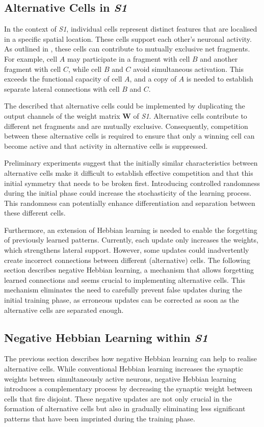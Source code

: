 \subsection{Alternative Cells in \emph{S1}}
In the context of \emph{S1}, individual cells represent distinct features that are localised in a specific spatial location. These cells support each other's neuronal activity. As outlined in , these cells can contribute to mutually exclusive net fragments. For example, cell $A$ may participate in a fragment with cell $B$ and another fragment with cell $C$, while cell $B$ and $C$ avoid simultaneous activation. This exceeds the functional capacity of cell $A$, and a copy of $A$ is needed to establish separate lateral connections with cell $B$ and $C$.

The  described that alternative cells could be implemented by duplicating the output channels of the weight matrix $\boldsymbol{W}$ of \emph{S1}.
Alternative cells contribute to different net fragments and are mutually exclusive.
Consequently, competition between these alternative cells is required to ensure that only a winning cell can become active and that activity in alternative cells is suppressed.

Preliminary experiments suggest that the initially similar characteristics between alternative cells make it difficult to establish effective competition and that this initial symmetry that needs to be broken first.
Introducing controlled randomness during the initial phase could increase the stochasticity of the learning process. This randomness can potentially enhance differentiation and separation between these different cells.

Furthermore, an extension of Hebbian learning is needed to enable the forgetting of previously learned patterns.
Currently, each update only increases the weights, which strengthens lateral support.
However, some updates could inadvertently create incorrect connections between different (alternative) cells.
The following section describes negative Hebbian learning, a mechanism that allows forgetting learned connections and seems crucial to implementing alternative cells.
This mechanism eliminates the need to carefully prevent false updates during the initial training phase, as erroneous updates can be corrected as soon as the alternative cells are separated enough.

\subsection{Negative Hebbian Learning within \emph{S1}}
The previous section describes how negative Hebbian learning can help to realise alternative cells.
While conventional Hebbian learning increases the synaptic weights between simultaneously active neurons, negative Hebbian learning introduces a complementary process by decreasing the synaptic weight between cells that fire disjoint.
These negative updates are not only crucial in the formation of alternative cells but also in gradually eliminating less significant patterns that have been imprinted during the training phase.


